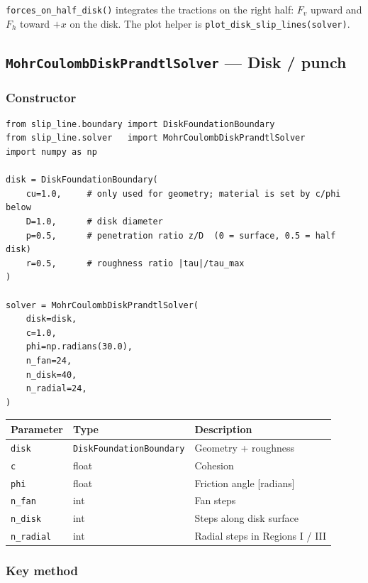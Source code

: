 \documentclass[11pt,a4paper]{article}
\begin{document}
\texttt{forces\_on\_half\_disk()} integrates the tractions on the right
half: $F_v$ upward and $F_h$ toward $+x$ on the disk.  The plot helper
is \texttt{plot\_disk\_slip\_lines(solver)}.

\subsection{\texttt{MohrCoulombDiskPrandtlSolver} — Disk / punch}
\label{sec:disk}

\subsubsection*{Constructor}

\begin{lstlisting}
from slip_line.boundary import DiskFoundationBoundary
from slip_line.solver   import MohrCoulombDiskPrandtlSolver
import numpy as np

disk = DiskFoundationBoundary(
    cu=1.0,     # only used for geometry; material is set by c/phi below
    D=1.0,      # disk diameter
    p=0.5,      # penetration ratio z/D  (0 = surface, 0.5 = half disk)
    r=0.5,      # roughness ratio |tau|/tau_max
)

solver = MohrCoulombDiskPrandtlSolver(
    disk=disk,
    c=1.0,
    phi=np.radians(30.0),
    n_fan=24,
    n_disk=40,
    n_radial=24,
)
\end{lstlisting}

\begin{center}
\begin{tabular}{lll}
\toprule
Parameter & Type & Description \\
\midrule
\texttt{disk} & \texttt{DiskFoundationBoundary} & Geometry + roughness \\
\texttt{c}    & float & Cohesion \\
\texttt{phi}  & float & Friction angle [radians] \\
\texttt{n\_fan}  & int & Fan steps \\
\texttt{n\_disk} & int & Steps along disk surface \\
\texttt{n\_radial} & int & Radial steps in Regions I / III \\
\bottomrule
\end{tabular}
\end{center}

\subsubsection*{Key method}
\end{document}
